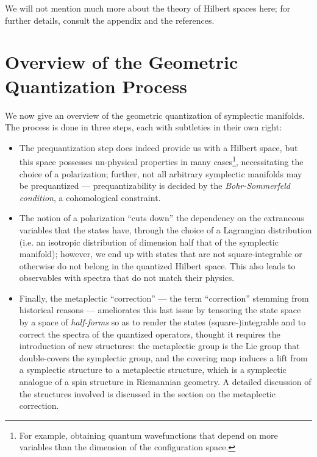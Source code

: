 We will not mention much more about the theory of Hilbert spaces here; for further details, consult the appendix and the references.










\section{Overview of the Geometric Quantization Process}
We now give an overview of the geometric quantization of symplectic manifolds. The process is done in three steps, each with subtleties in their own right:

\begin{itemize}
\item The prequantization step does indeed provide us with a Hilbert space, but this space possesses un-physical properties in many cases\footnote{For example, obtaining quantum wavefunctions that depend on more variables than the dimension of the configuration space.}, necessitating the choice of a polarization; further, not all arbitrary symplectic manifolds may be prequantized --- prequantizability is decided by the \emph{Bohr-Sommerfeld condition}, a cohomological constraint.

\item The notion of a polarization ``cuts down'' the dependency on the extraneous variables that the states have, through the choice of a Lagrangian distribution (i.e. an isotropic distribution of dimension half that of the symplectic manifold); however, we end up with states that are not square-integrable or otherwise do not belong in the quantized Hilbert space. This also leads to observables with spectra that do not match their physics.

\item Finally, the metaplectic ``correction'' --- the term ``correction'' stemming from historical reasons --- ameliorates this last issue by tensoring the state space by a space of \emph{half-forms} so as to render the states (square-)integrable and to correct the spectra of the quantized operators, thought it requires the introduction of new structures: the metaplectic group is the Lie group that double-covers the symplectic group, and the covering map induces a lift from a symplectic structure to a metaplectic structure, which is a symplectic analogue of a spin structure in Riemannian geometry. A detailed discussion of the structures involved is discussed in the section on the metaplectic correction.
\end{itemize}

